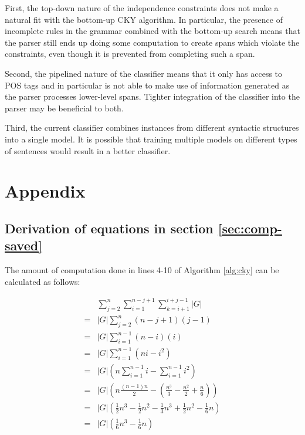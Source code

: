 \documentclass[11pt]{article}
\begin{document}
First, the top-down nature of the independence constraints does not
make a natural fit with the bottom-up CKY algorithm. In particular,
the presence of incomplete rules in the grammar combined with the
bottom-up search means that the parser still ends up doing some
computation to create spans which violate the constraints, even though
it is prevented from completing such a span.

Second, the pipelined nature of the classifier means that it only has
access to POS tags and in particular is not able to make use of
information generated as the parser processes lower-level spans.
Tighter integration of the classifier into the parser may be
beneficial to both.

Third, the current classifier combines instances from different
syntactic structures into a single model. It is possible that training
multiple models on different types of sentences would result in a
better classifier.

\section{Appendix}
\label{sec-8}

\subsection{Derivation of equations in section \ref{sec:comp-saved}}
\label{sec-8-1}

The amount of computation done in lines 4-10 of Algorithm \ref{alg:cky} can be calculated as follows:

\begin{align*}
& \sum_{j=2}^{n}\sum_{i=1}^{n-j+1}\sum_{k=i+1}^{i+j-1}|G|\\
=& |G|\sum_{j=2}^{n}(n-j+1)(j-1)\\
=& |G|\sum_{i=1}^{n-1}(n-i)(i)\\
=& |G|\sum_{i=1}^{n-1}(ni - i^2)\\
=& |G|(n\sum_{i=1}^{n-1}i - \sum_{i=1}^{n-1}i^2)\\
=& |G|(n\frac{(n-1)n}{2} - (\frac{n^3}{3} - \frac{n^2}{2} + \frac{n}{6}))\\
=& |G|(\frac{1}{2}n^3 - \frac{1}{2}n^2 - \frac{1}{3}n^3 + \frac{1}{2}n^2 - \frac{1}{6}n)\\
=& |G|(\frac{1}{6}n^3 - \frac{1}{6}n)
\end{align*}
\end{document}
